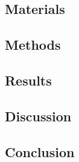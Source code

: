 \subsection{Materials}

\subsection{Methods}

\subsection{Results}

\subsection{Discussion}

\subsection{Conclusion}






